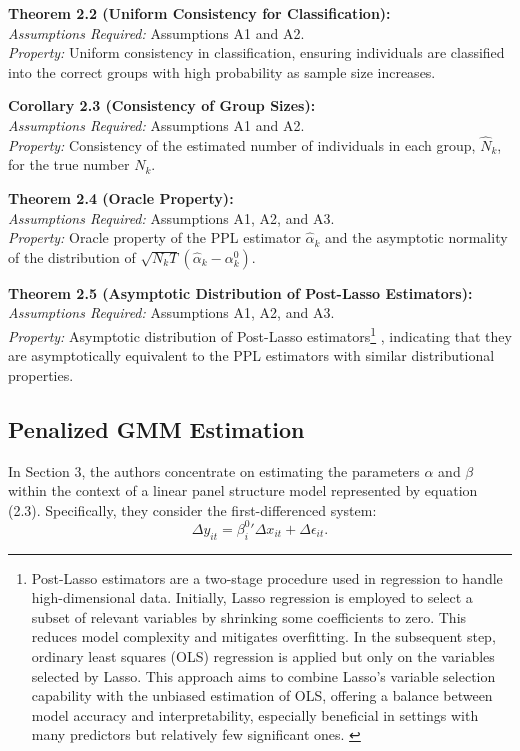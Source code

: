 \documentclass[UTF8,a4paper,10pt]{article}
\begin{document}
\textbf{Theorem 2.2 (Uniform Consistency for Classification):}\\
\textit{Assumptions Required:} Assumptions A1 and A2.\\
\textit{Property:} Uniform consistency in classification, ensuring individuals are classified into the correct groups with high probability as sample size increases.

\textbf{Corollary 2.3 (Consistency of Group Sizes):}\\
\textit{Assumptions Required:} Assumptions A1 and A2.\\
\textit{Property:} Consistency of the estimated number of individuals in each group, \(\hat{N}_k\), for the true number \(N_k\).

\textbf{Theorem 2.4 (Oracle Property):}\\
\textit{Assumptions Required:} Assumptions A1, A2, and A3.\\
\textit{Property:} Oracle property of the PPL estimator \(\hat{\alpha}_k\) and the asymptotic normality of the distribution of \(\sqrt{N_k T} (\hat{\alpha}_k - \alpha_{k}^0)\).

\textbf{Theorem 2.5 (Asymptotic Distribution of Post-Lasso Estimators):}\\
\textit{Assumptions Required:} Assumptions A1, A2, and A3.\\
\textit{Property:} Asymptotic distribution of Post-Lasso estimators\footnote{Post-Lasso estimators are a two-stage procedure used in regression to handle high-dimensional data. Initially, Lasso regression is employed to select a subset of relevant variables by shrinking some coefficients to zero. This reduces model complexity and mitigates overfitting. In the subsequent step, ordinary least squares (OLS) regression is applied but only on the variables selected by Lasso. This approach aims to combine Lasso's variable selection capability with the unbiased estimation of OLS, offering a balance between model accuracy and interpretability, especially beneficial in settings with many predictors but relatively few significant ones. \cite*[See][]{Belloni2013}}
, indicating that they are asymptotically equivalent to the PPL estimators with similar distributional properties.


\subsection{Penalized GMM Estimation}


In Section 3, the authors concentrate on estimating the parameters $\alpha$ and $\beta$ within the context of a linear panel structure model represented by equation (2.3). Specifically, they consider the first-differenced system:
\[\Delta y_{it} = {\beta_i^{0}}' \Delta x_{it} + \Delta\epsilon_{it}.\]
\end{document}
